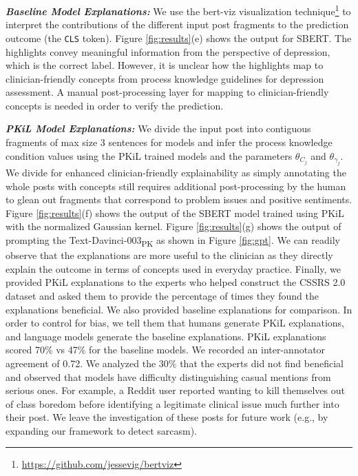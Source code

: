 \documentclass[letterpaper]{article} %
\begin{document}
\textit{\textbf{Baseline Model Explanations: }}
We use the bert-viz visualization technique\footnote{\url{https://github.com/jessevig/bertviz}} to interpret the contributions of the different input post fragments to the prediction outcome (the \texttt{CLS} token). Figure \ref{fig:results}(e) shows the output for SBERT. The highlights convey meaningful information from the perspective of depression, which is the correct label. However, it is unclear how the highlights map to clinician-friendly concepts from process knowledge guidelines for depression assessment. A manual post-processing layer for mapping to clinician-friendly concepts is needed in order to verify the prediction.

\textit{\textbf{PKiL Model Explanations: }}
We divide the input post into contiguous fragments of max size $3$ sentences for models and infer the process knowledge condition values using the PKiL trained models and the parameters $\theta_{C_j}$ and $\theta_{\gamma_j}$. We divide for enhanced clinician-friendly explainability as simply annotating the whole posts with concepts still requires additional post-processing by the human to glean out fragments that correspond to problem issues and positive sentiments. Figure \ref{fig:results}(f) shows the output of the SBERT model trained using PKiL with the normalized Gaussian kernel. Figure \ref{fig:results}(g) shows the output of prompting the Text-Davinci-003\textsubscript{PK} as shown in Figure \ref{fig:gpt}. We can readily observe that the explanations are more useful to the clinician as they directly explain the outcome in terms of concepts used in everyday practice. Finally, we provided PKiL explanations to the experts who helped construct the CSSRS 2.0 dataset and asked them to provide the percentage of times they found the explanations beneficial. We also provided baseline explanations for comparison. In order to control for bias, we tell them that humans generate PKiL explanations, and language models generate the baseline explanations. PKiL explanations scored 70\% vs 47\% for the baseline models. We recorded an inter-annotator agreement of 0.72. We analyzed the 30\% that the experts did not find beneficial and observed that models have difficulty distinguishing casual mentions from serious ones. For example, a Reddit user reported wanting to kill themselves out of class boredom before identifying a legitimate clinical issue much further into their post. We leave the investigation of these posts for future work (e.g., by expanding our framework to detect sarcasm). 
\end{document}
